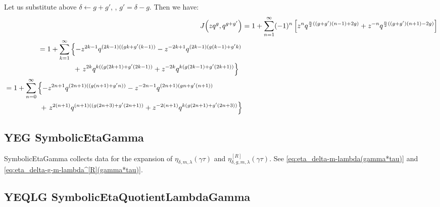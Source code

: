 \documentclass{article}
\begin{document}
Let us substitute above $\delta \gets g + g'$, \ie, $g'=\delta-g$.
Then we have:
\begin{align}
  J\!\left(zq^g,q^{g+g'}\right)
   &=
    1 + \sum_{n=1}^\infty (-1)^n \left[
    z^n q^{\frac{n}{2}((g+g') (n-1) + 2 g)}
    +
    z^{-n} q^{\frac{n}{2}((g+g') (n+1) - 2 g)}
    \right]
  \notag\\
  \begin{split}
  &=
    1 + \sum_{k=1}^\infty
    \left\{
    -
    z^{2k-1}
    q^{(2k-1)((g k + g' (k-1))}
    -
    z^{-2k+1}
    q^{(2k-1)(g (k-1) + g' k)}
    \right.
  \notag\\
  &\qquad\qquad\quad
    +
    \left.
    z^{2k}
    q^{k ((g (2k+1) + g' (2k-1))}
    +
    z^{-2k}
    q^{k (g (2k-1) +g' (2k+1))}
  \right\}
  \end{split}
  \notag\\
  \begin{split}
  &=
    1 + \sum_{n=0}^\infty
    \left\{
    -
    z^{2 n + 1}
    q^{(2 n + 1) ((g (n+1) + g' n))}
    -
    z^{-2n-1}
    q^{(2 n + 1) (g n + g' (n+1))}
    \right.
  \\
  &\qquad\qquad\quad
    +
    \left.
    z^{2(n+1)}
    q^{(n+1) ((g (2 n + 3) + g' (2 n + 1))}
    +
    z^{-2 (n + 1)}
    q^{k (g (2 n + 1) + g' (2 n + 3))}
  \right\}
  \end{split}
  \label{eq:Jacobi-g-g'}
\end{align}









\subsection{YEG SymbolicEtaGamma}

SymbolicEtaGamma collects data for the expansion of
$\eta_{\delta,m,\lambda}(\gamma\tau)$ and
$\eta_{\delta,g,m,\lambda}^{[R]}(\gamma\tau)$. See
\eqref{eq:eta_delta-m-lambda(gamma*tau)} and
\eqref{eq:eta_delta-g-m-lambda^[R](gamma*tau)}.



\subsection{YEQLG SymbolicEtaQuotientLambdaGamma}
\end{document}
